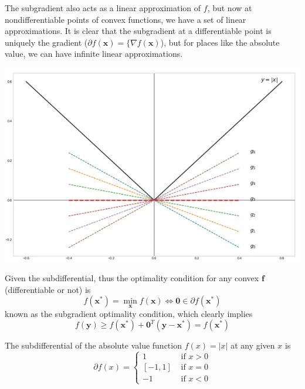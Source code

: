     The subgradient also acts as a linear approximation of $f$, but now at nondifferentiable points of convex functions, we have a set of linear approximations. It is clear that the subgradient at a differentiable point is uniquely the gradient ($\partial f(\mathbf{x}) = \{ \nabla f(\mathbf{x})$), but for places like the absolute value, we can have infinite linear approximations. 
    \begin{center}
      \includegraphics[scale=0.4]{img/subgradient_of_abs.png}
    \end{center}
    Given the subdifferential, thus the optimality condition for any convex $\mathbf{f}$ (differentiable or not) is
    \begin{equation}
      f(\mathbf{x}^\ast) = \min_{\mathbf{x}} f(\mathbf{x}) \iff \mathbf{0} \in \partial f(\mathbf{x}^\ast)
    \end{equation}
    known as the subgradient optimality condition, which clearly implies 
    \begin{equation}
      f(\mathbf{y}) \geq f(\mathbf{x}^\ast) + \mathbf{0}^T (\mathbf{y} - \mathbf{x}^\ast) = f(\mathbf{x}^\ast)
    \end{equation}

    \begin{example}
      The subdifferential of the absolute value function $f(x) = |x|$ at any given $x$ is 
      \begin{equation}
        \partial f(x) = \begin{cases} 1 & \text{ if } x > 0 \\ [-1, 1] & \text{ if } x = 0 \\ -1 & \text{ if } x < 0 \end{cases}
      \end{equation}
    \end{example}


